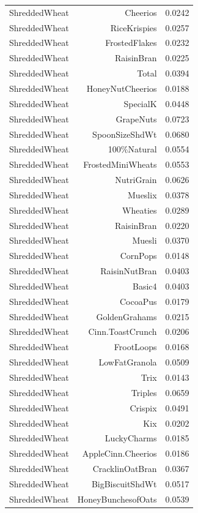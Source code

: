 \begin{longtable}{@{}lrr@{}}
ShreddedWheat & Cheerios & 0.0242 \\
ShreddedWheat & RiceKrispies & 0.0257 \\
ShreddedWheat & FrostedFlakes & 0.0232 \\
ShreddedWheat & RaisinBran & 0.0225 \\
ShreddedWheat & Total & 0.0394 \\
ShreddedWheat & HoneyNutCheerios & 0.0188 \\
ShreddedWheat & SpecialK & 0.0448 \\
ShreddedWheat & GrapeNuts & 0.0723 \\
ShreddedWheat & SpoonSizeShdWt & 0.0680 \\
ShreddedWheat & 100\%Natural & 0.0554 \\
ShreddedWheat & FrostedMiniWheats & 0.0553 \\
ShreddedWheat & NutriGrain & 0.0626 \\
ShreddedWheat & Mueslix & 0.0378 \\
ShreddedWheat & Wheaties & 0.0289 \\
ShreddedWheat & RaisinBran & 0.0220 \\
ShreddedWheat & Muesli & 0.0370 \\
ShreddedWheat & CornPops & 0.0148 \\
ShreddedWheat & RaisinNutBran & 0.0403 \\
ShreddedWheat & Basic4 & 0.0403 \\
ShreddedWheat & CocoaPus & 0.0179 \\
ShreddedWheat & GoldenGrahams & 0.0215 \\
ShreddedWheat & Cinn.ToastCrunch & 0.0206 \\
ShreddedWheat & FrootLoops & 0.0168 \\
ShreddedWheat & LowFatGranola & 0.0509 \\
ShreddedWheat & Trix & 0.0143 \\
ShreddedWheat & Triples & 0.0659 \\
ShreddedWheat & Crispix & 0.0491 \\
ShreddedWheat & Kix & 0.0202 \\
ShreddedWheat & LuckyCharms & 0.0185 \\
ShreddedWheat & AppleCinn.Cheerios & 0.0186 \\
ShreddedWheat & CracklinOatBran & 0.0367 \\
ShreddedWheat & BigBiscuitShdWt & 0.0517 \\
ShreddedWheat & HoneyBunchesofOats & 0.0539 \\

\end{longtable}

